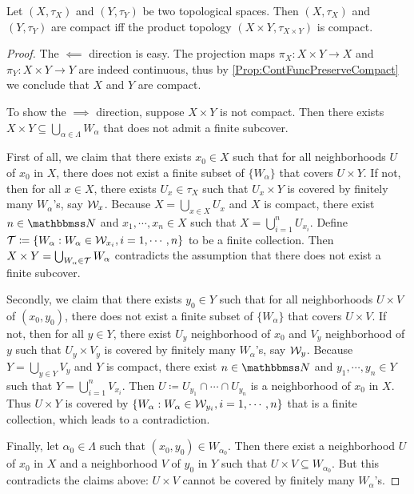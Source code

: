 \documentclass[screen,single]{techreport}
\numberwithin{equation}{section}
\begin{document}
\begin{theorem}\label{The:ProductOfCompactStillCompact}
	Let $(X,\tau_X)$ and $(Y,\tau_Y)$ be two topological spaces.
	Then $(X,\tau_X)$ and $(Y,\tau_Y)$ are compact iff the product topology $(X \times Y,\tau_{X \times Y})$ is compact. 
\end{theorem}
\begin{proof}
	The $\impliedby$ direction is easy.
	The projection maps $\pi_X : X \times Y \to X$ and $\pi_Y : X \times Y \to Y$ are indeed continuous, thus by \cref{Prop:ContFuncPreserveCompact} we conclude that $X$ and $Y$ are compact.
	
	To show the $\implies$ direction, suppose $X \times Y$ is not compact.
	Then there exists $X \times Y \subseteq \bigcup_{\alpha \in \Lambda} W_\alpha$ that does not admit a finite subcover.
	
	First of all, we claim that there exists $x_0 \in X$ such that for all neighborhoods $U$ of $x_0$ in $X$, there does not exist a finite subset of $\{W_\alpha\}$ that covers $U \times Y$.
	If not, then for all $x \in X$, there exists $U_x \in \tau_X$ such that $U_x \times Y$ is covered by finitely many $W_\alpha$'s, say $\mathcal{W}_x$.
	Because $X = \bigcup_{x \in X} U_x$ and $X$ is compact, there exist $n \in \bbN$ and $x_1,\cdots,x_n \in X$ such that $X = \bigcup_{i=1}^n U_{x_i}$.
	Define $\mathcal{T} \coloneqq \{ W_\alpha : W_\alpha \in \mathcal{W}_{x_i}, i=1,\cdots,n\}$ to be a finite collection.
	Then $X \times Y = \bigcup_{W_\alpha \in \mathcal{T}} W_\alpha$ contradicts the assumption that there does not exist a finite subcover.
	
	Secondly, we claim that there exists $y_0 \in Y$ such that for all neighborhoods $U \times V$ of $(x_0,y_0)$, there does not exist a finite subset of $\{ W_\alpha \}$ that covers $U \times V$.
	If not, then for all $y \in Y$, there exist $U_y$ neighborhood of $x_0$ and $V_y$ neighborhood of $y$ such that $U_y \times V_y$ is covered by finitely many $W_\alpha$'s, say $\mathcal{W}_y$.
	Because $Y = \bigcup_{y \in Y} V_y$ and $Y$ is compact, there exist $n \in \bbN$ and $y_1,\cdots,y_n \in Y$ such that $Y = \bigcup_{i=1}^n V_{x_i}$.
	Then $U \coloneqq U_{y_1} \cap \cdots \cap U_{y_n}$ is a neighborhood of $x_0$ in $X$.
	Thus $U \times Y$ is covered by $\{ W_\alpha : W_\alpha \in \mathcal{W}_{y_i}, i=1,\cdots,n\}$ that is a finite collection, which leads to a contradiction.
	
	Finally, let $\alpha_0 \in \Lambda$ such that $(x_0,y_0) \in W_{\alpha_0}$.
	Then there exist a neighborhood $U$ of $x_0$ in $X$ and a neighborhood $V$ of $y_0$ in $Y$ such that $U \times V \subseteq W_{\alpha_0}$.
	But this contradicts the claims above: $U \times V$ cannot be covered by finitely many $W_\alpha$'s.
\end{proof}
\end{document}

